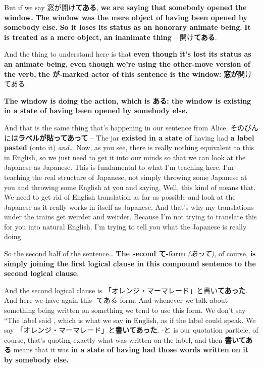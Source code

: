 \thinrule

But if we say 窓が開け{\bf てある}, {\bf we are saying that somebody opened the window.} {\bf The window was the mere object of having been opened by somebody else.} {\bf So it loses its status as an honorary animate being.} {\bf It is treated as a mere object, an inanimate thing} -- 開け{\bf てある}.

\thinrule

And the thing to understand here is that {\bf even though it's lost its status as an animate being,} {\bf even though we're using the other-move version of the verb,} {\bf the が-marked actor of this sentence is the window:} {\bf 窓が}開けてある.

{}

{\bf The window is doing the action, which is ある: the window is existing in a state of having been opened by somebody else.}

\thinrule

And that is the same thing that's happening in our sentence from Alice. そのびんには{\bf ラベルが貼ってあって} -- The jar {\bf existed in a state of} having had {\bf a label} {\bf pasted} (onto it) {\em and\ldots{}} Now, as you see, there is really nothing equivalent to this in English, so we just need to get it into our minds so that we can look at the Japanese as Japanese. This is fundamental to what I'm teaching here. I'm teaching the real structure of Japanese, not simply throwing some Japanese at you and throwing some English at you and saying, Well, this kind of means that. We need to get rid of English translation as far as possible and look at the Japanese as it really works in itself as Japanese. And that's why my translations under the trains get weirder and weirder. Because I'm not trying to translate this for you into natural English. I'm trying to tell you what the Japanese is really doing.

So the second half of the sentence\ldots{} {\bf The second て-form} {\em (あって)}, of course, {\bf is simply joining the first logical clause in this compound sentence to the second logical clause}.

{}

And the second logical clause is 「オレンジ・マーマレード」と書い{\bf てあった}. And here we have again this -てある form. And whenever we talk about something being written on something we tend to use this form. We don't say “The label said , which is what we say in English, as if the label could speak. We say 「オレンジ・マーマレード」と{\bf 書いてあった}. -と is our quotation particle, of course, that's quoting exactly what was written on the label, and then {\bf 書いてある} means that it was {\bf in a state of having had those words written on it by somebody else.}

